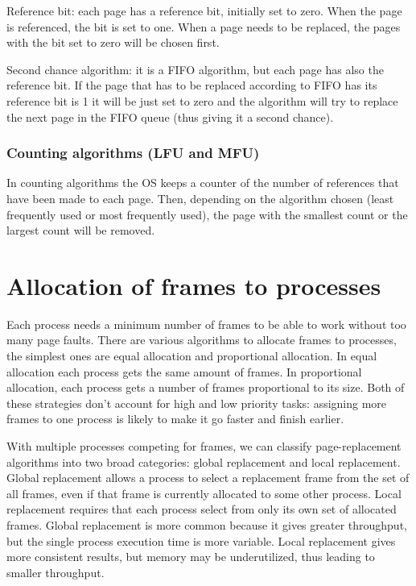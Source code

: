Reference bit: each page has a reference bit, initially set to zero. When the page is referenced, the bit is set to one. When a page needs to be replaced, the pages with the bit set to zero will be chosen first.

Second chance algorithm: it is a FIFO algorithm, but each page has also the reference bit. If the page that has to be replaced according to FIFO has its reference bit is 1 it will be just set to zero and the algorithm will try to replace the next page in the FIFO queue (thus giving it a second chance).

\subsubsection{Counting algorithms (LFU and MFU)}
In counting algorithms the OS keeps a counter of the number of references that have been made to each page. Then, depending on the algorithm chosen (least frequently used or most frequently used), the page with the smallest count or the largest count will be removed.

\section{Allocation of frames to processes}
Each process needs a minimum number of frames to be able to work without too many page faults. There are various algorithms to allocate frames to processes, the simplest ones are equal allocation and proportional allocation. In equal allocation each process gets the same amount of frames. In proportional allocation, each process gets a number of frames proportional to its size. Both of these strategies don't account for high and low priority tasks: assigning more frames to one process is likely to make it go faster and finish earlier.

With multiple processes competing for frames, we can classify page-replacement algorithms into two broad categories: global replacement and local replacement. Global replacement allows a process to select a replacement frame from the set of all frames, even if that frame is currently allocated to some other process. Local replacement requires that each process select from only its own set of allocated frames. Global replacement is more common because it gives greater throughput, but the single process execution time is more variable. Local replacement gives more consistent results, but memory may be underutilized, thus leading to smaller throughput.

